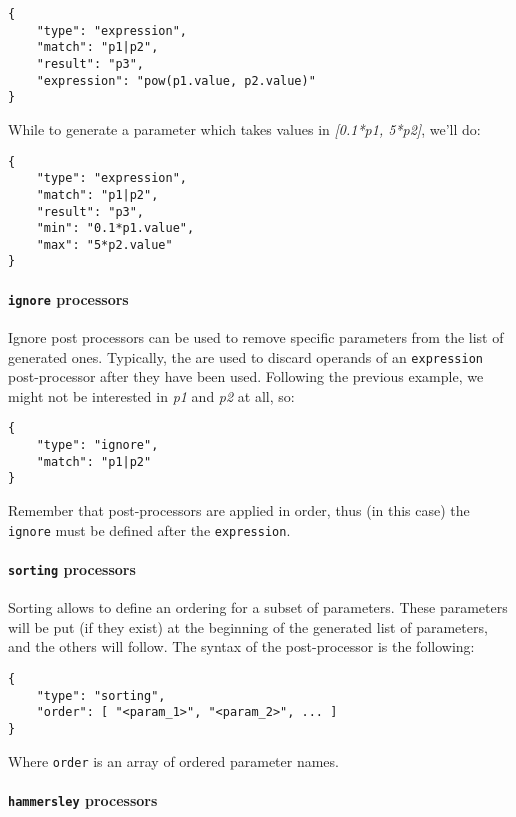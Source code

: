 \documentclass[11pt,notitlepage,twoside,a4paper]{article}
\begin{document}
\begin{footnotesize}
\begin{lstlisting}
{
    "type": "expression",
    "match": "p1|p2",
    "result": "p3",
    "expression": "pow(p1.value, p2.value)"
}
\end{lstlisting}

\newpage
\noindent
While to generate a parameter which takes values in \emph{{[}0.1*p1,
5*p2{]}}, we'll do:

\begin{lstlisting}
{
    "type": "expression",
    "match": "p1|p2",
    "result": "p3",
    "min": "0.1*p1.value",
    "max": "5*p2.value"
}
\end{lstlisting}

\paragraph{\texttt{ignore} processors}

Ignore post processors can be used to remove specific parameters from
the list of generated ones. Typically, the are used to discard operands
of an \texttt{expression} post-processor after they have been used.
Following the previous example, we might not be interested in \emph{p1}
and \emph{p2} at all, so:

\begin{lstlisting}
{
    "type": "ignore",
    "match": "p1|p2"
}
\end{lstlisting}

Remember that post-processors are applied in order, thus (in this case)
the \texttt{ignore} must be defined after the \texttt{expression}.

\paragraph{\texttt{sorting} processors}

Sorting allows to define an ordering for a subset of parameters. These
parameters will be put (if they exist) at the beginning of the generated
list of parameters, and the others will follow. The syntax of the
post-processor is the following:

\begin{lstlisting}
{
    "type": "sorting",
    "order": [ "<param_1>", "<param_2>", ... ]
}
\end{lstlisting}

\noindent
Where \texttt{order} is an array of ordered parameter names.

\paragraph{\texttt{hammersley} processors}


\end{footnotesize}
\end{document}
